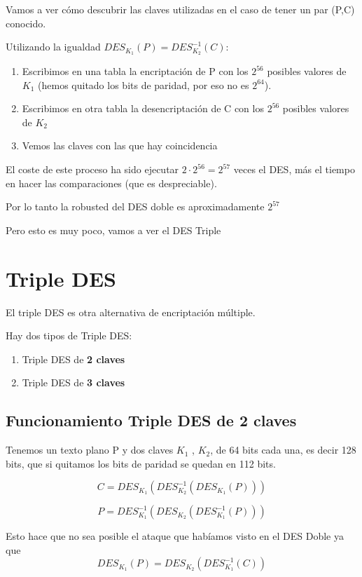 Vamos a ver cómo descubrir las claves utilizadas en el caso de tener un par (P,C) conocido.

Utilizando la igualdad $DES_{K_1}(P) = DES^{-1}_{K_2}(C)$:
\begin{enumerate}
	\item Escribimos en una tabla la encriptación de P con los $2^{56}$ posibles valores de $K_1$ (hemos quitado los bits de paridad, por eso no es $2^64$).
	
	\item Escribimos en otra tabla la desencriptación de C con los $2^{56}$ posibles valores de $K_2$
	
	\item Vemos las claves con las que hay coincidencia
	
\end{enumerate} 

El coste de este proceso ha sido ejecutar $2 \cdot 2^{56} = 2^{57}$ veces el DES, más el tiempo en hacer las comparaciones (que es despreciable).

Por lo tanto la robusted del DES doble es aproximadamente $2^{57}$

Pero esto es muy poco, vamos a ver el DES Triple

 
 \chapter{Triple DES}
 El triple DES es otra alternativa de encriptación múltiple.
 
 Hay dos tipos de Triple DES:
 \begin{enumerate}
 	\item Triple DES de \textbf{2 claves}
 	\item Triple DES de \textbf{3 claves}
 \end{enumerate}
 \section{Funcionamiento Triple DES de 2 claves}
 Tenemos un texto plano P y dos claves $K_1$ , $K_2$, de 64 bits cada una, es decir 128 bits, que si quitamos los bits de paridad se quedan en 112 bits.
 
 $$C = DES_{K_1}(DES^{-1}_{K_2}(DES_{K_1}(P)))$$
 
 $$P = DES^{-1}_{K_1}(DES_{K_2}(DES^{-1}_{K_1}(P)))$$
 
 Esto hace que no sea posible el ataque que habíamos visto en el DES Doble ya que
 $$DES_{K_1}(P) = DES_{K_2}(DES^{-1}_{K_1}(C))$$
 
